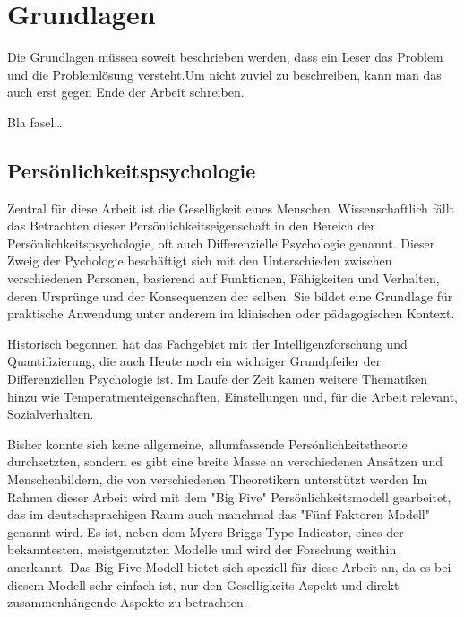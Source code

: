 
\chapter{Grundlagen}
\label{ch:Grundlagen}
Die Grundlagen müssen soweit beschrieben
werden, dass ein Leser das Problem und
die Problemlösung  versteht.Um nicht zuviel 
zu beschreiben, kann man das auch erst gegen 
Ende der Arbeit schreiben.

Bla fasel\ldots

\section{Persönlichkeitspsychologie}
\label{ch:Grundlagen:sec:Abschnitt1}

Zentral für diese Arbeit ist die Geselligkeit eines Menschen.
Wissenschaftlich fällt das Betrachten dieser Persönlichkeitseigenschaft in den Bereich der Persönlichkeitspsychologie,
oft auch Differenzielle Psychologie genannt. 
Dieser Zweig der Pychologie beschäftigt sich mit den Unterschieden zwischen verschiedenen Personen, 
basierend auf Funktionen, Fähigkeiten und Verhalten, deren Ursprünge und der Konsequenzen der selben.
Sie bildet eine Grundlage für praktische Anwendung unter anderem im klinischen oder pädagogischen Kontext.
\par

Historisch begonnen hat das Fachgebiet mit der Intelligenzforschung und Quantifizierung, 
die auch Heute noch ein wichtiger Grundpfeiler der Differenziellen Psychologie ist.
Im Laufe der Zeit kamen weitere Thematiken hinzu wie Temperatmenteigenschaften, Einstellungen und, für die Arbeit relevant, Sozialverhalten.
\par

Bisher konnte sich keine allgemeine, allumfassende Persönlichkeitstheorie durchsetzten, sondern es gibt eine breite Masse an verschiedenen Ansätzen und Menschenbildern, die von verschiedenen Theoretikern unterstützt werden
Im Rahmen dieser Arbeit wird mit dem "Big Five" Persönlichkeitsmodell gearbeitet, das im deutschsprachigen Raum auch manchmal das "Fünf Faktoren Modell" genannt wird.
Es ist, neben dem Myers-Briggs Type Indicator, eines der bekanntesten, meistgenutzten Modelle und wird der Forschung weithin anerkannt.
Das Big Five Modell bietet sich speziell für diese Arbeit an, da es bei diesem Modell sehr einfach ist, nur den Geselligkeits Aspekt und direkt zusammenhängende Aspekte zu betrachten.

